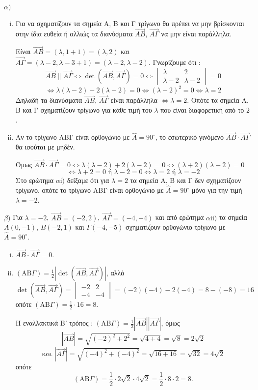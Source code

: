 \hfill \break
$\alpha)$
\begin{enumerate}[i.]
    \item Για να σχηματίζουν τα σημεία Α, Β και Γ τρίγωνο θα πρέπει να μην βρίσκονται στην ίδια ευθεία ή αλλιώς τα διανύσματα $\vec{AB}$, $\vec{A\Gamma}$ να μην είναι παράλληλα.

    Είναι $\vec{AB} = (\lambda, 1+1) = (\lambda,2)$ και $\vec{A\Gamma} = (\lambda-2, \lambda-3+1) = (\lambda-2, \lambda-2)$.
    Γνωρίζουμε ότι :
    \[ \vec{AB} \parallel \vec{A\Gamma} \Leftrightarrow \det (\vec{AB} , \vec{A\Gamma} ) = 0 \Leftrightarrow \begin{vmatrix} \lambda & 2 \\ \lambda-2 & \lambda-2 \end{vmatrix} = 0 \]
    \[ \Leftrightarrow \lambda(\lambda-2) - 2(\lambda-2) = 0 \Leftrightarrow (\lambda-2)^2 = 0 \Leftrightarrow \lambda = 2 \]
    Δηλαδή τα διανύσματα $\vec{AB}$, $\vec{A\Gamma}$ είναι παράλληλα $\Leftrightarrow \lambda = 2$. Οπότε τα σημεία Α, Β και Γ σχηματίζουν τρίγωνο για κάθε τιμή του $\lambda$ που είναι διαφορετική από το $2$.
    \item Αν το τρίγωνο ΑΒΓ είναι ορθογώνιο με $\hat{A} = 90^\circ$, το εσωτερικό γινόμενο $\vec{AB} \cdot \vec{A\Gamma}$ θα ισούται με μηδέν.

    Όμως $\vec{AB} \cdot \vec{A\Gamma} = 0 \Leftrightarrow \lambda (\lambda - 2) + 2 (\lambda - 2) = 0 \Leftrightarrow (\lambda + 2) (\lambda - 2) = 0$
    \[ \Leftrightarrow \lambda + 2 = 0 \text{ ή } \lambda - 2 = 0 \Leftrightarrow \lambda = 2 \text{ ή } \lambda = -2 \]
    Στο ερώτημα $\alpha\text{i})$ δείξαμε ότι για $\lambda = 2$ τα σημεία Α, Β και Γ δεν σχηματίζουν τρίγωνο, οπότε το τρίγωνο ΑΒΓ είναι ορθογώνιο με $\hat{A} = 90^\circ$ μόνο για την τιμή $\lambda = -2$.
\end{enumerate}

$\beta)$ Για $\lambda = -2$, $\vec{AB} = (-2, 2)$, $\vec{A\Gamma} = (-4 , -4)$ και από ερώτημα $\alpha\text{ii})$ τα σημεία $A(0, -1)$, $B(-2, 1)$ και $\Gamma(-4, -5)$ σχηματίζουν ορθογώνιο τρίγωνο με $\hat{A} = 90^\circ$.
\begin{enumerate}[i.]
    \item $\vec{AB} \cdot \vec{A\Gamma} = 0$.
    \item $(\text{AB}\Gamma) = \frac{1}{2} \left|\det (\vec{AB} , \vec{A\Gamma})\right|$, αλλά
    \[ \det (\vec{AB} , \vec{A\Gamma} ) = \begin{vmatrix} -2 & 2 \\ -4 & -4 \end{vmatrix} = (-2)(-4) - 2(-4) = 8 - (-8) = 16 \]
    οπότε $(\text{AB}\Gamma) = \frac{1}{2} \cdot 16 = 8$.

    Ή εναλλακτικά Β' τρόπος : $(\text{AB}\Gamma) = \frac{1}{2} |\vec{AB}| |\vec{A\Gamma}|$, όμως
    \[ |\vec{AB}| = \sqrt{(-2)^2 + 2^2} = \sqrt{4+4} = \sqrt{8} = 2\sqrt{2} \]
    \[ \text{και } |\vec{A\Gamma}| = \sqrt{(-4)^2 + (-4)^2} = \sqrt{16+16} = \sqrt{32} = 4\sqrt{2} \]
    οπότε
    \[ (\text{AB}\Gamma) = \frac{1}{2} \cdot 2\sqrt{2} \cdot 4\sqrt{2} = \frac{1}{2} \cdot 8 \cdot 2 = 8. \]
\end{enumerate}
\hfill \break
\vspace{1ex}
\hfill \break
{}